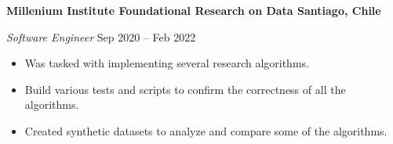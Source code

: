 \documentclass[../main.tex]{subfiles}
\begin{document}
    \textbf{Millenium Institute Foundational Research on Data \hfill  Santiago, Chile} \par
    \textit{Software Engineer} \hfill Sep 2020 -- Feb 2022 \par
    \begin{itemize}
        \item Was tasked with implementing several research algorithms.
        \item Build various tests and scripts to confirm the correctness of all the algorithms.
        \item Created synthetic datasets to analyze and compare some of the algorithms.
\end{itemize} \par
\end{document}
